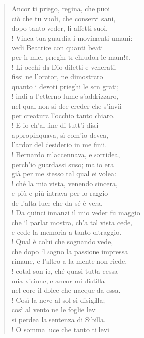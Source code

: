\documentclass[a4paper, twoside, titlepage]{book}
\begin{document}
\begin{verse}
Ancor ti priego, regina, che puoi\\
ciò che tu vuoli, che conservi sani,\\
dopo tanto veder, li affetti suoi.\\!
Vinca tua guardia i movimenti umani:\\
vedi Beatrice con quanti beati\\
per li miei prieghi ti chiudon le mani!».\\!
Li occhi da Dio diletti e venerati,\\
fissi ne l’orator, ne dimostraro\\
quanto i devoti prieghi le son grati;\\!
indi a l’etterno lume s’addrizzaro,\\
nel qual non si dee creder che s’invii\\
per creatura l’occhio tanto chiaro.\\!
E io ch’al fine di tutt’i disii\\
appropinquava, sì com’io dovea,\\
l’ardor del desiderio in me finii.\\!
Bernardo m’accennava, e sorridea,\\
perch’io guardassi suso; ma io era\\
già per me stesso tal qual ei volea:\\!
ché la mia vista, venendo sincera,\\
e più e più intrava per lo raggio\\
de l’alta luce che da sé è vera.\\!
Da quinci innanzi il mio veder fu maggio\\
che ‘l parlar mostra, ch’a tal vista cede,\\
e cede la memoria a tanto oltraggio.\\!
Qual è colui che sognando vede,\\
che dopo ‘l sogno la passione impressa\\
rimane, e l’altro a la mente non riede,\\!
cotal son io, ché quasi tutta cessa\\
mia visione, e ancor mi distilla\\
nel core il dolce che nacque da essa.\\!
Così la neve al sol si disigilla;\\
così al vento ne le foglie levi\\
si perdea la sentenza di Sibilla.\\!
O somma luce che tanto ti levi\\

\end{verse}
\end{document}
